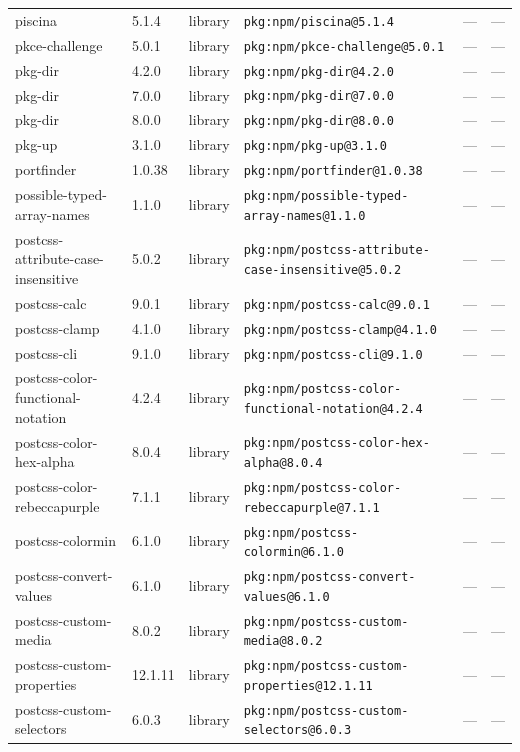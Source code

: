 \documentclass[11pt]{article}
\begin{document}
\begin{longtable}{|l|l|l|p{2.2cm}|l|p{4cm}|}
piscina & 5.1.4 & library & \texttt{pkg:npm/piscina@5.1.4} & — & — \\
pkce-challenge & 5.0.1 & library & \texttt{pkg:npm/pkce-challenge@5.0.1} & — & — \\
pkg-dir & 4.2.0 & library & \texttt{pkg:npm/pkg-dir@4.2.0} & — & — \\
pkg-dir & 7.0.0 & library & \texttt{pkg:npm/pkg-dir@7.0.0} & — & — \\
pkg-dir & 8.0.0 & library & \texttt{pkg:npm/pkg-dir@8.0.0} & — & — \\
pkg-up & 3.1.0 & library & \texttt{pkg:npm/pkg-up@3.1.0} & — & — \\
portfinder & 1.0.38 & library & \texttt{pkg:npm/portfinder@1.0.38} & — & — \\
possible-typed-array-names & 1.1.0 & library & \texttt{pkg:npm/possible-typed-array-names@1.1.0} & — & — \\
postcss-attribute-case-insensitive & 5.0.2 & library & \texttt{pkg:npm/postcss-attribute-case-insensitive@5.0.2} & — & — \\
postcss-calc & 9.0.1 & library & \texttt{pkg:npm/postcss-calc@9.0.1} & — & — \\
postcss-clamp & 4.1.0 & library & \texttt{pkg:npm/postcss-clamp@4.1.0} & — & — \\
postcss-cli & 9.1.0 & library & \texttt{pkg:npm/postcss-cli@9.1.0} & — & — \\
postcss-color-functional-notation & 4.2.4 & library & \texttt{pkg:npm/postcss-color-functional-notation@4.2.4} & — & — \\
postcss-color-hex-alpha & 8.0.4 & library & \texttt{pkg:npm/postcss-color-hex-alpha@8.0.4} & — & — \\
postcss-color-rebeccapurple & 7.1.1 & library & \texttt{pkg:npm/postcss-color-rebeccapurple@7.1.1} & — & — \\
postcss-colormin & 6.1.0 & library & \texttt{pkg:npm/postcss-colormin@6.1.0} & — & — \\
postcss-convert-values & 6.1.0 & library & \texttt{pkg:npm/postcss-convert-values@6.1.0} & — & — \\
postcss-custom-media & 8.0.2 & library & \texttt{pkg:npm/postcss-custom-media@8.0.2} & — & — \\
postcss-custom-properties & 12.1.11 & library & \texttt{pkg:npm/postcss-custom-properties@12.1.11} & — & — \\
postcss-custom-selectors & 6.0.3 & library & \texttt{pkg:npm/postcss-custom-selectors@6.0.3} & — & — \\

\end{longtable}
\end{document}
